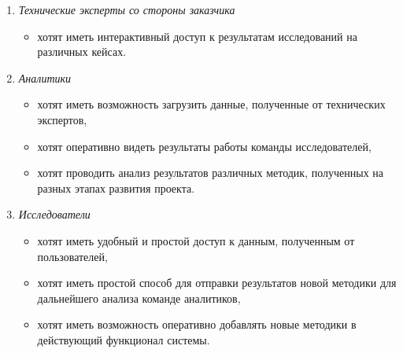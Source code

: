 \begin{enumerate}
    \item {
        \textit{Технические эксперты со стороны заказчика}
        \begin{itemize}
            \item хотят иметь интерактивный доступ к результатам исследований на различных кейсах.
        \end{itemize}
    }
    \item {
        \textit{Аналитики}
        \begin{itemize}
            \item хотят иметь возможность загрузить данные, полученные от технических экспертов,
            \item хотят оперативно видеть результаты работы команды исследователей,
            \item хотят проводить анализ результатов различных методик, полученных на разных этапах развития проекта.
        \end{itemize}
    }
    \item {
        \textit{Исследователи}
        \begin{itemize}
            \item хотят иметь удобный и простой доступ к данным, полученным от пользователей,
            \item хотят иметь простой способ для отправки результатов новой методики для дальнейшего анализа команде аналитиков,
            \item хотят иметь возможность оперативно добавлять новые методики в действующий функционал системы.
        \end{itemize}
    }
\end{enumerate}

